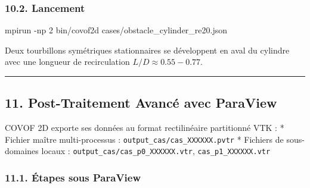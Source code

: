 \documentclass[
  french,
]{article}
\newenvironment{Shaded}{}{}
\newcommand{\AttributeTok}[1]{\textcolor[rgb]{0.49,0.56,0.16}{#1}}
\newcommand{\ExtensionTok}[1]{#1}
\newcommand{\NormalTok}[1]{#1}
\begin{document}
\subsubsection{10.2. Lancement}\label{lancement-3}

\begin{Shaded}
\begin{Highlighting}[]
\ExtensionTok{mpirun} \AttributeTok{{-}np}\NormalTok{ 2 bin/covof2d cases/obstacle\_cylinder\_re20.json}
\end{Highlighting}
\end{Shaded}

Deux tourbillons symétriques stationnaires se développent en aval du
cylindre avec une longueur de recirculation \(L/D \approx 0.55-0.77\).

\begin{center}\rule{0.5\linewidth}{0.5pt}\end{center}

\subsection{11. Post-Traitement Avancé avec
ParaView}\label{post-traitement-avancuxe9-avec-paraview}

COVOF 2D exporte ses données au format rectilinéaire partitionné VTK : *
Fichier maître multi-processus : \texttt{output\_cas/cas\_XXXXXX.pvtr} *
Fichiers de sous-domaines locaux :
\texttt{output\_cas/cas\_p0\_XXXXXX.vtr}, \texttt{cas\_p1\_XXXXXX.vtr}

\subsubsection{11.1. Étapes sous
ParaView}\label{uxe9tapes-sous-paraview}
\end{document}
